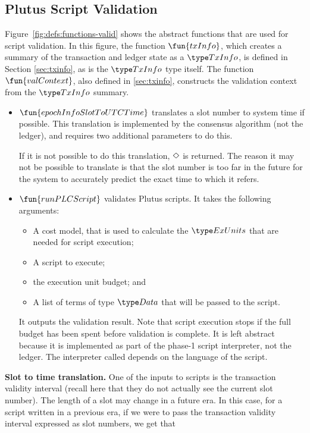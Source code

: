 \subsection{Plutus Script Validation}
Figure~\ref{fig:defs:functions-valid} shows the abstract functions that are used for script validation.
In this figure, the function $\fun{txInfo}$, which creates a summary of the transaction
and ledger state as a $\TxInfo$, is defined in Section \ref{sec:txinfo}, as is the $\TxInfo$
type itself.
The function $\fun{valContext}$, also defined in \ref{sec:txinfo}, constructs the
validation context from the $\TxInfo$ summary.

\begin{itemize}
\item $\fun{epochInfoSlotToUTCTime}$ translates a slot number to system time if possible.
This translation is implemented by the consensus algorithm (not the ledger), and requires
two additional parameters to do this.

If it is not possible to do this translation, $\Diamond$ is returned.
The reason it may not be possible to translate is that the slot number
is too far in the future for the system to accurately
predict the exact time to which it refers.

\item
  $\fun{runPLCScript}$ validates Plutus scripts. It takes the following
  arguments:
  \begin{itemize}
  \item A cost model, that is used to calculate the $\ExUnits$ that are needed for script execution;
  \item A script to execute;
  \item the execution unit budget; and
  \item A list of terms of type $\Data$ that will be passed to the script.
  \end{itemize}
  It outputs the validation result.
  Note that script execution stops if the full budget has been spent before validation is complete.
  It is left abstract because it is implemented as part of the phase-1 script interpreter, not the ledger.
  The interpreter called depends on the language of the script.
\end{itemize}


\textbf{Slot to time translation.}
One of the inputs to scripts is the transaction validity interval (recall here that
they do not actually see the current slot number). The length of a
slot may change in a future era. In this case, for a script written in a previous
era, if we were to pass the transaction validity interval expressed as slot numbers,
we get that

